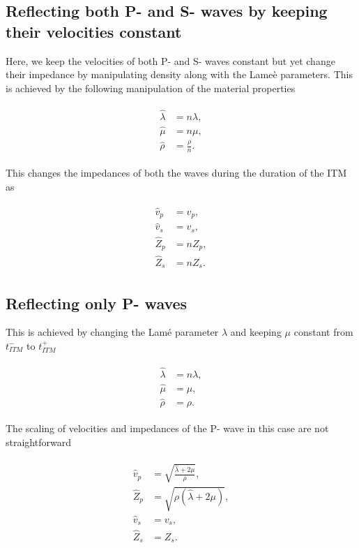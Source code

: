 \subsection{Reflecting both P- and S- waves by keeping their velocities constant}
Here, we keep the velocities of both P- and S- waves constant but yet change their impedance by manipulating density along with the Lame\`{e} parameters. This is achieved by the following manipulation of the material properties

\begin{align}
    \begin{split}
        \hat{\lambda} &= n \lambda ,\\
        \hat{\mu} &= n \mu ,\\
        \hat{\rho} &= \frac{\rho} {n} .
    \end{split}
\end{align}

This changes the impedances of both the waves during the duration of the \ac{ITM} as

\begin{align}
    \begin{split}
        \hat{v}_p &= v_p ,\\
        \hat{v}_s &= v_s ,\\
        \hat{Z}_p &= n Z_p ,\\
        \hat{Z}_s &= n Z_s .
    \end{split}
\end{align}

\subsection{Reflecting only P- waves}

This is achieved by changing the Lam\'{e} parameter $\lambda$ and keeping $\mu$ constant from $t_{ITM}^-$ to $t_{ITM}^+$

\begin{align}
    \begin{split}
        \hat{\lambda} &= n \lambda ,\\
        \hat{\mu} &= \mu ,\\
        \hat{\rho} &= \rho .
    \end{split}
\end{align}

The scaling of velocities and impedances of the P- wave in this case are not straightforward 

\begin{align}
    \begin{split}
        \hat{v}_p &= \sqrt{\frac{\hat{\lambda} + 2 \mu}{\rho}} ,\\
        \hat{Z}_p &= \sqrt{\rho\left(\hat{\lambda} + 2 \mu \right)} ,\\
        \hat{v}_s &= v_s ,\\
        \hat{Z}_s &= Z_s . 
    \end{split}
\end{align}

